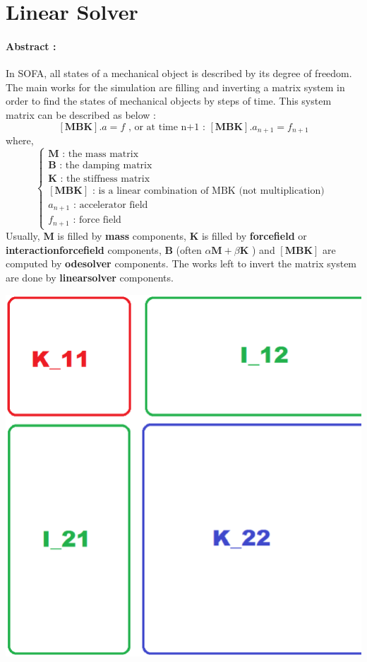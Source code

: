 \documentclass[a4paper,10pt]{article}
\begin{document}
\section{Linear Solver}
\paragraph{Abstract : }
In SOFA, all states of a mechanical object is described by its degree of freedom. The main works for the simulation are filling and inverting a matrix system in order to find the states of mechanical objects by steps of time. This system matrix can be described as below :
 \[
\left[ \textbf{MBK} \right].a=f \text{    ,  or at time n+1 :   }\left[ \textbf{MBK} \right].a_{n+1}=f_{n+1}
\]
where,
\[
\left\{ 
\begin{array}{l}
\textbf{M} \text { : the mass matrix   }  \\
\textbf{B} \text { : the damping matrix   }  \\
\textbf{K} \text { : the stiffness matrix   }  \\
\left[ \textbf{MBK} \right] \text {  : is a linear combination of MBK (not multiplication)   }  \\
a_{n+1} \text { : accelerator field} \\
f_{n+1} \text { : force field} 
\end{array}\right.
\]
 Usually, \textbf{M} is filled by \textbf{\color{orange}mass} components, \textbf{K} is filled by \textbf{\color{orange}forcefield} or \textbf{\color{orange}interactionforcefield} components, \textbf{B} (often $\alpha\textbf{M}+\beta\textbf{K}$ ) and $\left[ \textbf{MBK} \right]$ are computed by \textbf{\color{orange}odesolver} components. The works left to invert the matrix system are done by \textbf{\color{orange}linearsolver} components.
\begin{center}
\includegraphics[scale=0.3]{matrix_bloc}
\end{center}
\end{document}

